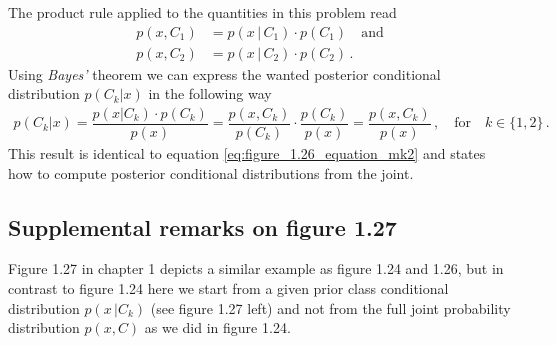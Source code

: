 \documentclass[11pt, DINA4, fleqn]{amsart}
\begin{document}
The product rule applied to the quantities in this problem read
\begin{align}
p(x, C_1) &= p(x\, | \, C_1) \cdot p(C_1) \quad \text{and} \\
p(x, C_2) &= p(x\, | \, C_2) \cdot p(C_2) \, .
\label{eq:product_rule}
\end{align}
Using \emph{Bayes'} theorem we can express the wanted posterior conditional distribution $p(C_k | x)$ in the following way
\begin{align}
p(C_k | x) = \dfrac{p(x | C_k) \cdot p(C_k)}{p(x)} = \dfrac{p(x, C_k)}{p(C_k)} \cdot \dfrac{p(C_k)}{p(x)} = \dfrac{p(x, C_k)}{p(x)} \, , \quad \text{for} \quad k\in\{1,2\} \, .
\end{align}
This result is identical to equation \eqref{eq:figure_1.26_equation_mk2} and states how to compute posterior conditional distributions from the joint.

\subsection{Supplemental remarks on figure 1.27}
Figure 1.27 in chapter 1 depicts a similar example as figure 1.24 and 1.26, but in contrast to figure 1.24 here we start from a given prior class conditional distribution $p(x \, | C_k)$ (see figure 1.27 left) and not from the full joint probability distribution $p(x, C)$ as we did in figure 1.24.
\end{document}
